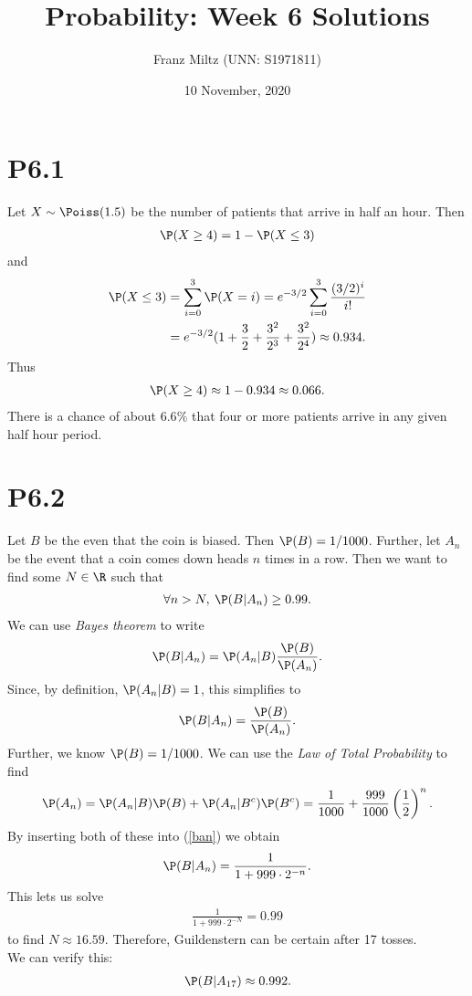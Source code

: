 \documentclass{article}
\begin{document}
\title{Probability: Week 6 Solutions}
\author{Franz Miltz (UNN: S1971811)}
\date{10 November, 2020}
\maketitle


\section*{P6.1}


Let $X\sim\Poiss(1.5)$ be the number of patients that arrive in half an hour. Then
\begin{align*}
  \P(X \geq 4) = 1 - \P(X \leq 3)
\end{align*}
and
\begin{align*}
  \P(X \leq 3) & = \sum_{i=0}^3 \P(X=i)=e^{-3/2}\sum_{i=0}^3 \frac{(3/2)^i}{i!} \\
               & =e^{-3/2} (1+\frac{3}{2}+\frac{3^2}{2^3}+\frac{3^2}{2^4})
  \approx 0.934.
\end{align*}
Thus
\begin{align*}
  \P(X\geq 4) \approx 1 - 0.934 \approx 0.066.
\end{align*}
There is a chance of about $6.6\%$ that four or more patients arrive in
any given half hour period.


\section*{P6.2}


Let $B$ be the even that the coin is biased. Then $\P(B)=1/1000$. Further,
let $A_n$ be the event that a coin comes down heads $n$ times in a row.
Then we want to find some $N\in\R$ such that
\begin{align*}
  \forall n > N,\: \P(B|A_n)\geq 0.99.
\end{align*}
We can use \emph{Bayes theorem} to write
\begin{align*}
  \P(B|A_n) = \P(A_n|B)\frac{\P(B)}{\P(A_n)}.
\end{align*}
Since, by definition, $\P(A_n|B)=1$, this simplifies to
\begin{align}
  \label{ban}
  \P(B|A_n) = \frac{\P(B)}{\P(A_n)}.
\end{align}
Further, we know $\P(B)=1/1000$. We can use the \emph{Law of Total
  Probability} to find
\begin{align*}
  \P(A_n)=\P(A_n|B)\P(B) + \P(A_n|B^c)\P(B^c)
  =\frac{1}{1000}+\frac{999}{1000}\left(\frac{1}{2}\right)^n.
\end{align*}
By inserting both of these into (\ref{ban}) we obtain
\begin{align*}
  \P(B|A_n) = \frac{1}{1+999\cdot 2^{-n}}.
\end{align*}
This lets us solve
\begin{align*}
  \frac{1}{1+999\cdot 2^{-N}} = 0.99
\end{align*}
to find $N\approx 16.59$. Therefore, Guildenstern can be certain after
17 tosses.\\
We can verify this:
\begin{align*}
  \P(B|A_{17}) \approx 0.992.
\end{align*}
\end{document}
